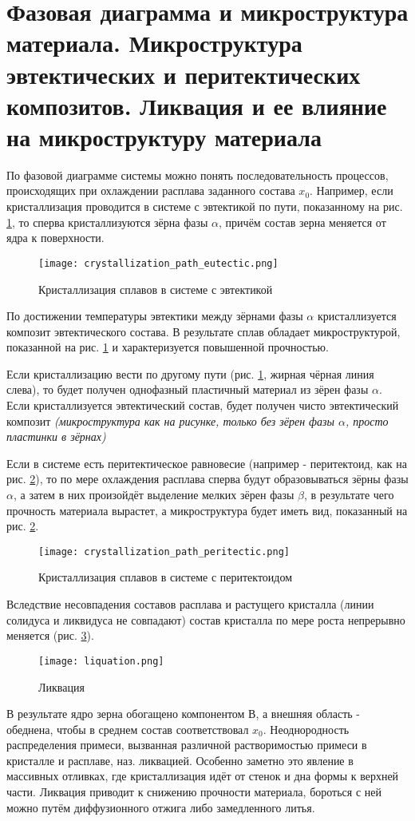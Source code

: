 \section{Фазовая диаграмма и микроструктура материала. Микроструктура
эвтектических и перитектических композитов. Ликвация и ее влияние на
микроструктуру материала}
По фазовой диаграмме системы можно понять последовательность процессов, происходящих при охлаждении расплава заданного состава $x_0$. Например, если кристаллизация проводится в системе с эвтектикой по пути, показанному на рис. \ref{fig:crystallization_path_eutectic}, то сперва кристаллизуются зёрна фазы $\alpha$, причём состав зерна меняется от ядра к поверхности.
\begin{figure}[h!]
\centering
\texttt{[image: crystallization\_path\_eutectic.png]}\caption{Кристаллизация сплавов в системе с эвтектикой}\label{fig:crystallization_path_eutectic}
\end{figure}
По достижении температуры эвтектики между зёрнами фазы $\alpha$ кристаллизуется композит эвтектического состава. В результате сплав обладает микроструктурой, показанной на рис. \ref{fig:crystallization_path_eutectic} и характеризуется повышенной прочностью. 
\par
Если кристаллизацию вести по другому пути (рис. \ref{fig:crystallization_path_eutectic}, жирная чёрная линия слева), то будет получен однофазный пластичный материал из зёрен фазы $\alpha$. Если кристаллизуется эвтектический состав, будет получен чисто эвтектический композит \textit{(микроструктура как на рисунке, только без зёрен фазы $\alpha$, просто пластинки в зёрнах)}
\par
Если в системе есть перитектическое равновесие (например - перитектоид, как на рис. \ref{fig:crystallization_path_peritectic}), то по мере охлаждения расплава сперва будут образовываться зёрны фазы $\alpha$, а затем в них произойдёт выделение мелких зёрен фазы $\beta$, в результате чего прочность материала вырастет, а микроструктура будет иметь вид, показанный на рис. \ref{fig:crystallization_path_peritectic}.
\begin{figure}[h!]
\centering
\texttt{[image: crystallization\_path\_peritectic.png]}\caption{Кристаллизация сплавов в системе с перитектоидом}\label{fig:crystallization_path_peritectic}
\end{figure}
\par Вследствие несовпадения составов расплава и растущего кристалла (линии солидуса и ликвидуса не совпадают) состав кристалла по мере роста непрерывно меняется (рис. \ref{fig:liquation}).
\begin{figure}[h!]
\centering
\texttt{[image: liquation.png]}\caption{Ликвация}\label{fig:liquation}
\end{figure}
В результате ядро зерна обогащено компонентом В, а внешняя область - обеднена, чтобы в среднем состав соответствовал $x_0$. Неоднородность распределения примеси, вызванная различной растворимостью примеси в кристалле и расплаве, наз. ликвацией. Особенно заметно это явление в массивных отливках, где кристаллизация идёт от стенок и дна формы к верхней части. Ликвация приводит к снижению прочности материала, бороться с ней можно путём диффузионного отжига либо замедленного литья.
